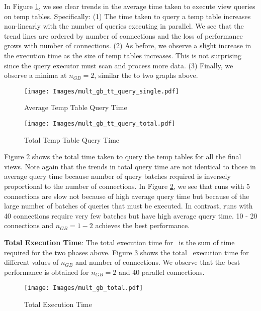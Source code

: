 In Figure \ref{fig:avg_tt_query_time}, we see clear trends in  the average time
taken to execute view queries on temp tables. Specifically: (1) The time taken
to query a temp table increases non-linearly with the number of queries
executing in parallel. We see that the trend lines are ordered by number of
connections and the loss of performance grows with number of connections. (2) As
before, we observe a slight increase in the execution time as the size of temp
tables increases. This is not surprising since the query executor must scan and
process more data. (3) Finally, we observe a minima at $n_{GB}=2$, similar the to
two graphs above.


\begin{figure}[h]
  \centering
    \texttt{[image: Images/mult\_gb\_tt\_query\_single.pdf]}
  \caption{Average Temp Table Query Time}
  \label{fig:avg_tt_query_time}
\end{figure}

\begin{figure}[h]
  \centering
    \texttt{[image: Images/mult\_gb\_tt\_query\_total.pdf]}
     \caption{Total Temp Table Query Time} 
       \label{fig:total_tt_query_time}
\end{figure}

Figure \ref{fig:total_tt_query_time} shows the total time taken to query the
temp tables for all the final views. Note again that the trends in total query
time are not identical to those in average query time because number of query
batches required is inversely proportional to the number of connections.
In Figure \ref{fig:total_tt_query_time}, we see that runs with 5 connections are
slow not because of high average query time but because of the large number of
batches of queries that must be executed. In contrast, runs with 40 connections
require very few batches but have high average query time. 10 - 20 connections
and $n_{GB}=1-2$ achieves the best performance.



{\bf Total Execution Time}: The total execution time for \SeeDB\ is the sum of
time required for the two phases above. Figure \ref{fig:total_time} shows the
total \SeeDB\ execution time for different values of $n_{GB}$ and number of
connections. We observe that the best performance is obtained for
$n_{GB}=2$ and 40 parallel connections.

\begin{figure}[h]
     \centering
    \texttt{[image: Images/mult\_gb\_total.pdf]}
    \caption{Total Execution Time}
  \label{fig:total_time}
\end{figure}

